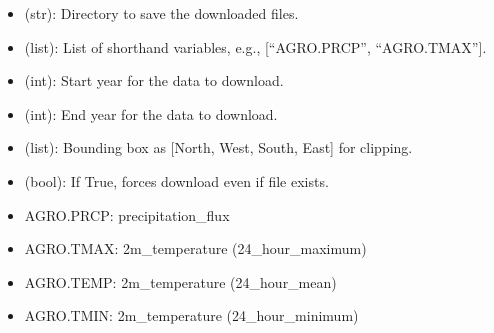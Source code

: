 \documentclass[letterpaper,10pt,english]{sphinxmanual}
\begin{document}
\sphinxAtStartPar
{}
\begin{itemize}
\item {} 
\sphinxAtStartPar
{} (str): Directory to save the downloaded files.

\item {} 
\sphinxAtStartPar
{} (list): List of shorthand variables, e.g., {[}“AGRO.PRCP”, “AGRO.TMAX”{]}.

\item {} 
\sphinxAtStartPar
{} (int): Start year for the data to download.

\item {} 
\sphinxAtStartPar
{} (int): End year for the data to download.

\item {} 
\sphinxAtStartPar
{} (list): Bounding box as {[}North, West, South, East{]} for clipping.

\item {} 
\sphinxAtStartPar
{} (bool): If True, forces download even if file exists.

\end{itemize}

\sphinxAtStartPar
{}
\begin{itemize}
\item {} 
\sphinxAtStartPar
AGRO.PRCP: precipitation\_flux

\item {} 
\sphinxAtStartPar
AGRO.TMAX: 2m\_temperature (24\_hour\_maximum)

\item {} 
\sphinxAtStartPar
AGRO.TEMP: 2m\_temperature (24\_hour\_mean)

\item {} 
\sphinxAtStartPar
AGRO.TMIN: 2m\_temperature (24\_hour\_minimum)

\end{itemize}

\sphinxAtStartPar
{}
\end{document}
